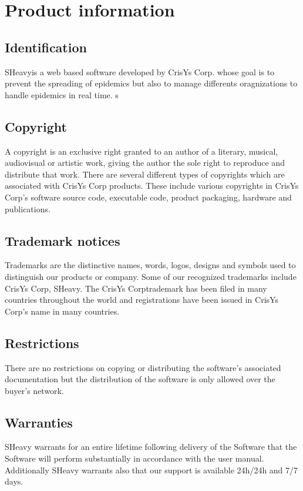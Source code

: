 \chapter{Product information}
\vspace{-6em}

\section{Identification}
SHeavy\textregistered is a web based software developed by CrisYs Corp. whose goal is to
prevent the spreading of epidemics but also to manage differents oragnizations to handle epidemics
in real time.  s

\section{Copyright}
A copyright is an exclusive right granted to an author of a literary, musical,
audiovisual or artistic work, giving the author the sole right to reproduce and distribute that work. 
There are several different types of copyrights which are associated with CrisYs
Corp products. These include various copyrights in CrisYs Corp's
software source code, executable code, product packaging, hardware and publications.

\section{Trademark notices}
Trademarks are the distinctive names, words, logos, designs and symbols used to distinguish our
products or company. Some of our recognized trademarks include CrisYs
Corp\textregistered, SHeavy\textregistered. The CrisYs Corp\textregistered trademark has been filed
in many countries throughout the world and registrations have been issued in
CrisYs Corp's name in many countries. 

\section{Restrictions}
There are no restrictions on copying or distributing the
software's associated documentation but the distribution of the software is only
allowed over the buyer's network.

\section{Warranties}
SHeavy warrants for an entire lifetime following delivery of the Software that
the Software will perform substantially in accordance with the user manual.
Additionally SHeavy warrants also that our support is available 24h/24h and
7/7 days.

